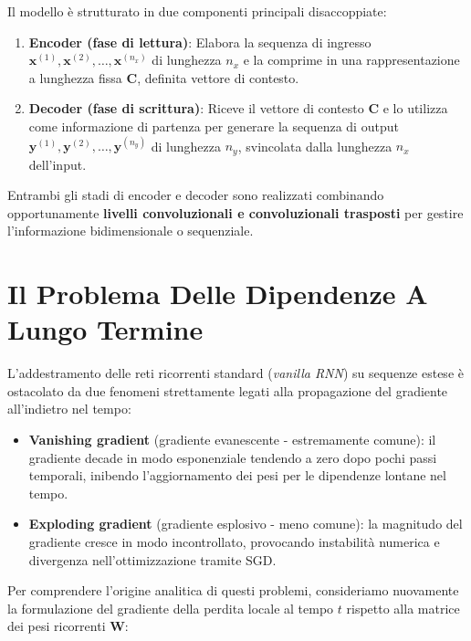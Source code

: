 ﻿\documentclass[11pt, a4paper]{article}
\begin{document}

Il modello è strutturato in due componenti principali disaccoppiate:
\begin{enumerate}
    \item \textbf{Encoder (fase di lettura)}: Elabora la sequenza di ingresso $\bm{x}^{(1)}, \bm{x}^{(2)}, \dots, \bm{x}^{(n_x)}$ di lunghezza $n_x$ e la comprime in una rappresentazione a lunghezza fissa $\bm{C}$, definita vettore di contesto.
    \item \textbf{Decoder (fase di scrittura)}: Riceve il vettore di contesto $\bm{C}$ e lo utilizza come informazione di partenza per generare la sequenza di output $\bm{y}^{(1)}, \bm{y}^{(2)}, \dots, \bm{y}^{(n_y)}$ di lunghezza $n_y$, svincolata dalla lunghezza $n_x$ dell'input.
\end{enumerate}
Entrambi gli stadi di encoder e decoder sono realizzati combinando opportunamente \textbf{livelli convoluzionali e convoluzionali trasposti} per gestire l'informazione bidimensionale o sequenziale.

\newpage

\section{Il Problema Delle Dipendenze A Lungo Termine}

L'addestramento delle reti ricorrenti standard (\emph{vanilla RNN}) su sequenze estese è ostacolato da due fenomeni strettamente legati alla propagazione del gradiente all'indietro nel tempo:
\begin{itemize}
    \item \textbf{Vanishing gradient} (gradiente evanescente - estremamente comune): il gradiente decade in modo esponenziale tendendo a zero dopo pochi passi temporali, inibendo l'aggiornamento dei pesi per le dipendenze lontane nel tempo.
    \item \textbf{Exploding gradient} (gradiente esplosivo - meno comune): la magnitudo del gradiente cresce in modo incontrollato, provocando instabilità numerica e divergenza nell'ottimizzazione tramite SGD.
\end{itemize}

Per comprendere l'origine analitica di questi problemi, consideriamo nuovamente la formulazione del gradiente della perdita locale al tempo $t$ rispetto alla matrice dei pesi ricorrenti $\bm{W}$:
\end{document}
